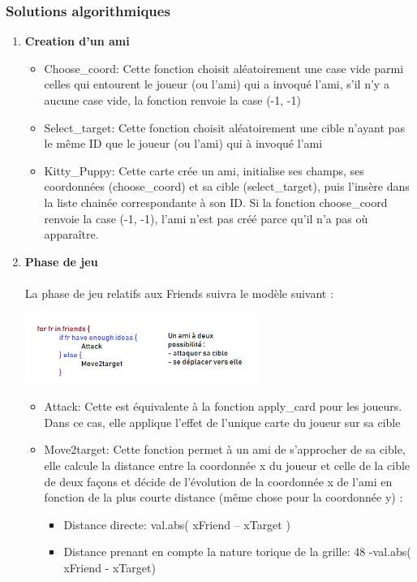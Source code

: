 \documentclass[a4paper]{article}
\begin{document}
\newpage
\subsubsection{Solutions algorithmiques}
\begin{enumerate}
\item \textbf{Creation d’un ami}
\begin{itemize}
\item Choose\_coord: Cette fonction choisit aléatoirement une case vide parmi celles qui entourent le joueur (ou l’ami) qui a invoqué l’ami, s’il n’y a aucune case vide, la fonction renvoie la case (-1, -1)\\
\item Select\_target: Cette fonction choisit aléatoirement une cible n’ayant pas le même ID que le joueur (ou l’ami) qui à invoqué l’ami\\
\item Kitty\_Puppy: Cette carte crée un ami, initialise ses champs, ses coordonnées (choose\_coord) et sa cible (select\_target), puis l’insère dans la liste chainée correspondante à son ID. Si la fonction choose\_coord renvoie la case (-1, -1), l’ami n’est pas créé parce qu'il n'a pas où apparaître.\\
\end{itemize}

\item \textbf{Phase de jeu}\\\\
La phase de jeu relatifs aux Friends suivra le modèle suivant :
\begin{center}
\includegraphics[width=0.6\textwidth]{Ach3_1}\\[1cm]
\end{center}
\begin{itemize}
\item Attack: Cette est équivalente à la fonction apply\_card pour les joueurs. Dans ce cas, elle applique l’effet de l’unique carte du joueur sur sa cible\\
\item Move2target: Cette fonction permet à un ami de s’approcher de sa cible, elle calcule la distance entre la coordonnée x du joueur et celle de la cible de deux façons et décide de l’évolution de la coordonnée x de l’ami en fonction de la plus courte distance (même chose pour la coordonnée y) :
\begin{itemize}
\item Distance directe:  val.abs( xFriend – xTarget ) 	
\item Distance prenant en compte la nature torique de la grille: 48 -val.abs( xFriend - xTarget)


\end{itemize}
\end{itemize}
\end{enumerate}
\end{document}
